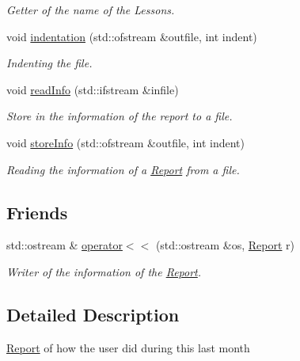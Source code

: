 \begin{DoxyCompactItemize}
$$\begin{DoxyCompactList}\small\item\em Getter of the name of the Lessons. \end{DoxyCompactList}\item 
void \mbox{\hyperlink{class_report_a67a10004cf149f202015d55a14efe6c1}{indentation}} (std\+::ofstream \&outfile, int indent)
\begin{DoxyCompactList}\small\item\em Indenting the file. \end{DoxyCompactList}\item 
void \mbox{\hyperlink{class_report_ad36785f4f4531404a6464c6d5ce5a69b}{read\+Info}} (std\+::ifstream \&infile)
\begin{DoxyCompactList}\small\item\em Store in the information of the report to a file. \end{DoxyCompactList}\item 
void \mbox{\hyperlink{class_report_a47faf2023bd07e59ab0296e8d0b2d512}{store\+Info}} (std\+::ofstream \&outfile, int indent)
\begin{DoxyCompactList}\small\item\em Reading the information of a \mbox{\hyperlink{class_report}{Report}} from a file. \end{DoxyCompactList}\end{DoxyCompactItemize}
\subsection*{Friends}
\begin{DoxyCompactItemize}
\item 
std\+::ostream \& \mbox{\hyperlink{class_report_a9c2eaa693abfadab4a6e151daee874e4}{operator$<$$<$}} (std\+::ostream \&os, \mbox{\hyperlink{class_report}{Report}} r)
\begin{DoxyCompactList}\small\item\em Writer of the information of the \mbox{\hyperlink{class_report}{Report}}. \end{DoxyCompactList}\end{DoxyCompactItemize}


\subsection{Detailed Description}
\mbox{\hyperlink{class_report}{Report}} of how the user did during this last month 


